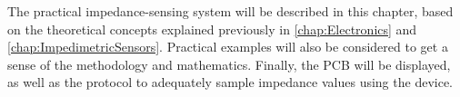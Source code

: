 The practical impedance-sensing system will be described in this chapter, based on the theoretical concepts explained previously in \autoref{chap:Electronics} and \autoref{chap:ImpedimetricSensors}. Practical examples will also be considered to get a sense of the methodology and mathematics. Finally, the PCB will be displayed, as well as the protocol to adequately sample impedance values using the device.